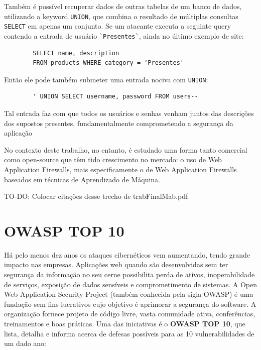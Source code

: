 \begin{alineas}
    \item
    Também é possível recuperar dados de outras tabelas de um banco de dados, utilizando a keyword \verb+UNION+, que combina o resultado de múltiplas consultas \verb+SELECT+ em apenas um conjunto. Se um atacante executa a seguinte query contendo a entrada de usuário \verb+`Presentes`+, ainda no último exemplo de site:
    
    \begin{verbatim}
        SELECT name, description
        FROM products WHERE category = ‘Presentes'
    \end{verbatim}
    
    Então ele pode também submeter uma entrada nociva com \verb+UNION+:
    
    \begin{verbatim}
        ' UNION SELECT username, password FROM users--
    \end{verbatim}
        
    Tal entrada faz com que todos os usuários e senhas venham juntos das descrições dos supostos presentes, fundamentalmente comprometendo a segurança da aplicação

\end{alineas}


No contexto deste trabalho, no entanto, é estudado uma forma tanto comercial como open-source que têm tido crescimento no mercado: o uso de Web Application Firewalls, mais especificamente o de Web Application Firewalls baseados em técnicas de Aprendizado de Máquina.

TO-DO: Colocar citações desse trecho de trabFinalMab.pdf 

\section{OWASP TOP 10}

Há pelo menos dez anos os ataques cibernéticos vem aumentando, tendo grande impacto nas empresas.
Aplicações web quando são desenvolvidas sem ter segurança da informação no seu cerne possibilita perda de ativos, inoperabilidade de serviços, exposição de dados sensíveis e comprometimento de sistemas. 
A Open Web Application Security Project (também conhecida pela sigla OWASP) é uma fundação sem fins lucrativos cujo objetivo é aprimorar a segurança do software. A organização fornece projeto de código livre, vasta comunidade ativa, conferências, treinamentos e boas práticas. Uma das iniciativas é o \textbf{OWASP TOP 10}, que lista, detalha e informa acerca de defesas possíveis para as 10 vulnerabilidades de um dado ano:

